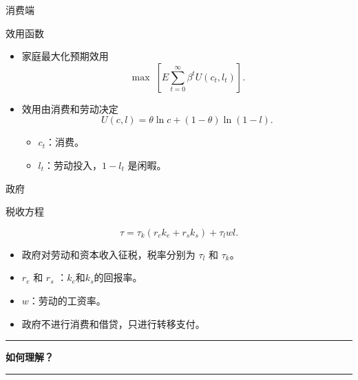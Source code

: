 \documentclass[aspectratio=169,10pt]{beamer}
\begin{document}
\begin{frame}{消费端}
  \begin{block}{效用函数}
    \begin{itemize}
      \item 家庭最大化预期效用
            \begin{equation}
              \max \; \left[E\sum_{t=0}^{\infty}\beta^t U(c_t,l_t)\right].
            \end{equation}
      \item 效用由消费和劳动决定
            \begin{equation}
              U(c,l)=\theta \ln c+(1-\theta)\ln(1-l).
            \end{equation}
            \begin{itemize}
              \item $c_t$：消费。
              \item $l_t$：劳动投入，$1-l_t$ 是闲暇。
            \end{itemize}
    \end{itemize}
  \end{block}
\end{frame}

\begin{frame}{政府}

  \begin{block}{税收方程}

    \begin{equation}
      \tau=\tau_k(r_e k_e+r_s k_s)+\tau_l w l.
    \end{equation}
    \begin{itemize}
      \item 政府对劳动和资本收入征税，税率分别为 $\tau_l$ 和 $\tau_k$。
      \item $r_e$ 和 $r_s$ ：$k_e$和$k_s$的回报率。
      \item $w$：劳动的工资率。
      \item 政府不进行消费和借贷，只进行转移支付。
    \end{itemize}
  \end{block}


\end{frame}

\begin{frame}[t]
  \vfill
  \begin{center}
    {\color{ModernRed}\rule{0.2\linewidth}{0.9pt}\par}
    \vspace{0.35cm}
    {\bfseries\fontsize{38}{46}\selectfont 如何理解？\par}
    \vspace{0.3cm}
    {\color{ModernRed}\rule{0.2\linewidth}{0.9pt}\par}
  \end{center}
  \vfill
\end{frame}
\end{document}
